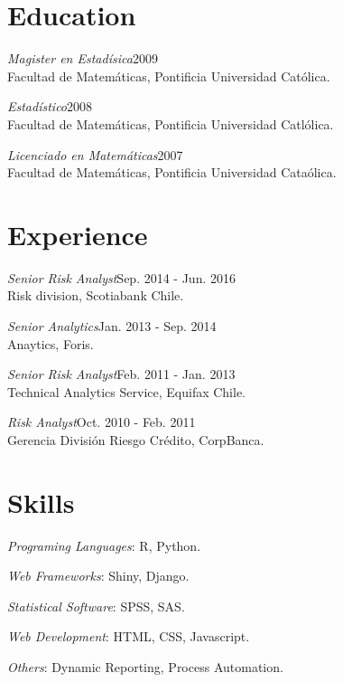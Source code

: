 \documentclass[margin]{res}
\begin{document}
\begin{resume}

\section{Education}

    {\sl Magister en Estadísica}\hfill 2009\\
    Facultad de Matemáticas, Pontificia Universidad Católica.

    {\sl Estadístico}\hfill 2008\\
    Facultad de Matemáticas, Pontificia Universidad Catlólica.

    {\sl Licenciado en Matemáticas}\hfill 2007\\
    Facultad de Matemáticas, Pontificia Universidad Cataólica.

\vspace{1cm}

\section{Experience}

    {\sl Senior Risk Analyst}\hfill Sep. 2014 - Jun. 2016\\
        Risk division, Scotiabank Chile.

    {\sl Senior Analytics}\hfill Jan. 2013 - Sep. 2014\\
    Anaytics, Foris.

    {\sl Senior Risk Analyst}\hfill Feb. 2011 - Jan. 2013\\
    Technical Analytics Service, Equifax Chile.

    {\sl Risk Analyst}\hfill Oct. 2010 - Feb. 2011\\
    Gerencia División Riesgo Crédito, CorpBanca.

\vspace{1cm}

\section{Skills}

    {\sl Programing Languages}: R, Python.

    {\sl Web Frameworks}: Shiny, Django.

    {\sl Statistical Software}: SPSS, SAS.
    
    {\sl Web Development}: HTML, CSS, Javascript.
    
    {\sl Others}: Dynamic Reporting, Process Automation.


\end{resume}
\end{document}
